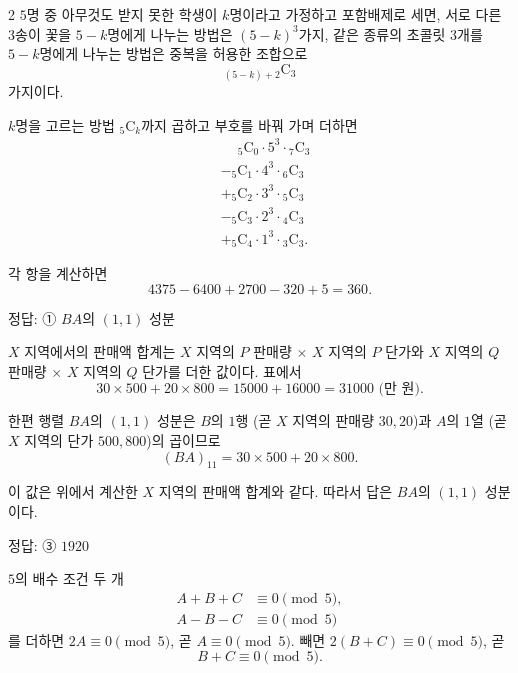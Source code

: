 \documentclass[10pt]{article}
\begin{document}
\begin{multicols}{2}
$5$명 중 아무것도 받지 못한 학생이 $k$명이라고 가정하고 포함배제로 세면, 서로 다른 $3$송이 꽃을 $5-k$명에게 나누는 방법은 $(5-k)^3$가지, 같은 종류의 초콜릿 $3$개를 $5-k$명에게 나누는 방법은 중복을 허용한 조합으로
\[ {}_{(5-k)+2}\mathrm{C}_3 \]
가지이다.

$k$명을 고르는 방법 ${}_5\mathrm{C}_k$까지 곱하고 부호를 바꿔 가며 더하면
\begin{align*}
&\phantom{-} {}_5\mathrm{C}_0 \cdot 5^3 \cdot {}_7\mathrm{C}_3 \\
&- {}_5\mathrm{C}_1 \cdot 4^3 \cdot {}_6\mathrm{C}_3 \\
&+ {}_5\mathrm{C}_2 \cdot 3^3 \cdot {}_5\mathrm{C}_3 \\
&- {}_5\mathrm{C}_3 \cdot 2^3 \cdot {}_4\mathrm{C}_3 \\
&+ {}_5\mathrm{C}_4 \cdot 1^3 \cdot {}_3\mathrm{C}_3.
\end{align*}

각 항을 계산하면
\[ 4375 - 6400 + 2700 - 320 + 5 = 360. \]

\begin{answerbox}정답: ① $BA$의 $(1, 1)$ 성분\end{answerbox}

$X$ 지역에서의 판매액 합계는 $X$ 지역의 $P$ 판매량 $\times$ $X$ 지역의 $P$ 단가와 $X$ 지역의 $Q$ 판매량 $\times$ $X$ 지역의 $Q$ 단가를 더한 값이다. 표에서
\[ 30 \times 500 + 20 \times 800 = 15000 + 16000 = 31000 \text{ (만 원)}. \]

한편 행렬 $BA$의 $(1, 1)$ 성분은 $B$의 $1$행 (곧 $X$ 지역의 판매량 $30, 20$)과 $A$의 $1$열 (곧 $X$ 지역의 단가 $500, 800$)의 곱이므로
\[ (BA)_{11} = 30 \times 500 + 20 \times 800. \]

이 값은 위에서 계산한 $X$ 지역의 판매액 합계와 같다. 따라서 답은 $BA$의 $(1, 1)$ 성분이다.

\begin{answerbox}정답: ③ $1920$\end{answerbox}

$5$의 배수 조건 두 개
\begin{align*}
A + B + C &\equiv 0 \pmod{5}, \\
A - B - C &\equiv 0 \pmod{5}
\end{align*}
를 더하면 $2A \equiv 0 \pmod 5$, 곧 $A \equiv 0 \pmod{5}$. 빼면 $2(B + C) \equiv 0 \pmod{5}$, 곧
\[ B + C \equiv 0 \pmod{5}. \]


\end{multicols}
\end{document}
